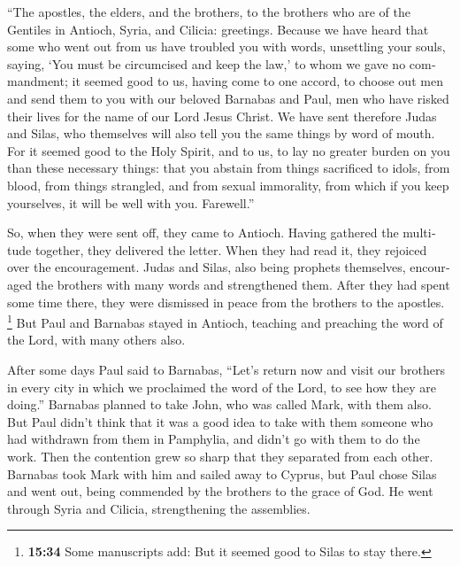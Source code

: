 \begin{paracol}{2}
\begin{otherlanguage}{english}
``The apostles, the elders, and the brothers, to the brothers who are of
the Gentiles in Antioch, Syria, and Cilicia: greetings. 
Because we have heard that some who went out from us have troubled you
with words, unsettling your souls, saying, `You must be circumcised and
keep the law,' to whom we gave no commandment;  it seemed
good to us, having come to one accord, to choose out men and send them
to you with our beloved Barnabas and Paul,  men who have
risked their lives for the name of our Lord Jesus Christ.
 We have sent therefore Judas and Silas, who themselves
will also tell you the same things by word of mouth.  For
it seemed good to the Holy Spirit, and to us, to lay no greater burden
on you than these necessary things:  that you abstain
from things sacrificed to idols, from blood, from things strangled, and
from sexual immorality, from which if you keep yourselves, it will be
well with you. Farewell.''

 So, when they were sent off, they came to Antioch.
Having gathered the multitude together, they delivered the letter.
 When they had read it, they rejoiced over the
encouragement.  Judas and Silas, also being prophets
themselves, encouraged the brothers with many words and strengthened
them.  After they had spent some time there, they were
dismissed in peace from the brothers to the apostles. 
\footnote{\textbf{15:34} Some manuscripts add: But it seemed good to
  Silas to stay there.}  But Paul and Barnabas stayed in
Antioch, teaching and preaching the word of the Lord, with many others
also.

 After some days Paul said to Barnabas, ``Let's return
now and visit our brothers in every city in which we proclaimed the word
of the Lord, to see how they are doing.''  Barnabas
planned to take John, who was called Mark, with them also.
 But Paul didn't think that it was a good idea to take
with them someone who had withdrawn from them in Pamphylia, and didn't
go with them to do the work.  Then the contention grew so
sharp that they separated from each other. Barnabas took Mark with him
and sailed away to Cyprus,  but Paul chose Silas and went
out, being commended by the brothers to the grace of God.
 He went through Syria and Cilicia, strengthening the
assemblies.

\end{otherlanguage}


\end{paracol}
